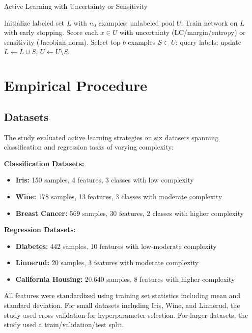 \documentclass[conference]{IEEEtran}
\begin{document}
\begin{algorithm}[t]
\caption{Active Learning with Uncertainty or Sensitivity}
\label{alg:al}
\begin{algorithmic}[1]
\State Initialize labeled set $L$ with $n_0$ examples; unlabeled pool $U$.
  \State Train network on $L$ with early stopping.
  \State Score each $x\in U$ with uncertainty (LC/margin/entropy) or sensitivity (Jacobian norm).
  \State Select top-$b$ examples $S\subset U$; query labels; update $L\leftarrow L\cup S$, $U\leftarrow U\setminus S$.
\EndWhile
\end{algorithmic}
\end{algorithm}

\section{Empirical Procedure}

\subsection{Datasets}

The study evaluated active learning strategies on six datasets spanning classification and regression tasks of varying complexity:

\textbf{Classification Datasets:}
\begin{itemize}
\item \textbf{Iris:} 150 samples, 4 features, 3 classes with low complexity
\item \textbf{Wine:} 178 samples, 13 features, 3 classes with moderate complexity
\item \textbf{Breast Cancer:} 569 samples, 30 features, 2 classes with higher complexity
\end{itemize}

\textbf{Regression Datasets:}
\begin{itemize}
\item \textbf{Diabetes:} 442 samples, 10 features with low-moderate complexity
\item \textbf{Linnerud:} 20 samples, 3 features with moderate complexity
\item \textbf{California Housing:} 20,640 samples, 8 features with higher complexity
\end{itemize}

All features were standardized using training set statistics including mean and standard deviation. For small datasets including Iris, Wine, and Linnerud, the study used cross-validation for hyperparameter selection. For larger datasets, the study used a train/validation/test split.
\end{document}
